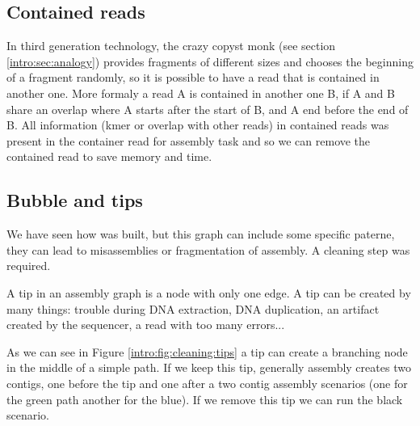 \documentclass[main]{subfiles}
\begin{document}
\subsection{Contained reads} \label{intro:subsubsec:contained_reads}

In third generation technology, the crazy copyst monk (see section \ref{intro:sec:analogy}) provides fragments of different sizes and chooses the beginning of a fragment randomly, so it is possible to have a read that is contained in another one. More formaly a read A is contained in another one B, if A and B share an overlap where A starts after the start of B, and A end before the end of B. All information (kmer or overlap with other reads) in contained reads was present in the container read for assembly task and so we can remove the contained read to save memory and time.

\subsection{Bubble and tips} \label{intro:subsubsec:bubble_tips}

We have seen how \OLC was built, but this graph can include some specific paterne, they can lead to misassemblies or fragmentation of assembly. A cleaning step was required.

\begin{figure}[ht]
    \caption{}
    \label{intro:fig:cleaning}
\end{figure}

A tip in an assembly graph is a node with only one edge. A tip can be created by many things: trouble during DNA extraction, DNA duplication, an artifact created by the sequencer, a read with too many errors...

As we can see in Figure \ref{intro:fig:cleaning:tips} a tip can create a branching node in the middle of a simple path. If we keep this tip, generally assembly creates two contigs, one before the tip and one after a two contig assembly scenarios (one for the green path another for the blue). If we remove this tip we can run the black scenario.
\end{document}
